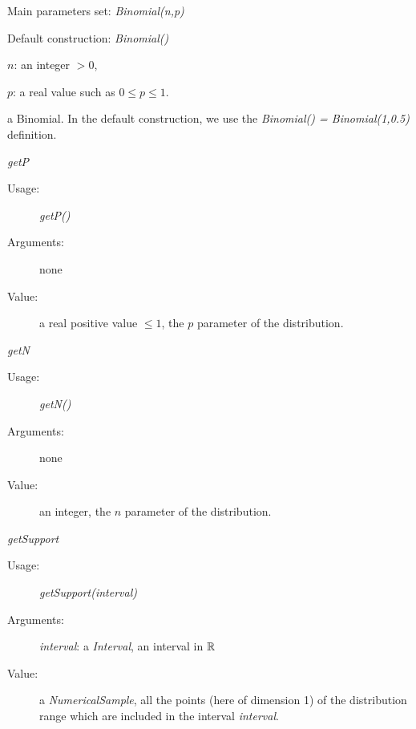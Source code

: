 \begin{description}

\item[Usage:]\rule{0pt}{1em}
\begin{description}
\item Main parameters set: \textit{Binomial(n,p)}
\item  Default construction: \textit{Binomial()}
\end{description}

\item[Arguments:]  \rule{0pt}{1em}
\begin{description}
\item $n$: an integer $>0$,
\item  $p$: a real value such as $0\leq p\leq 1$.
\end{description}

\item[Value:] a Binomial. In the default construction, we use the \textit{Binomial() = Binomial(1,0.5)} definition.

\item[Some methods:] \rule{0pt}{1em}
\begin{description}

\item \textit{getP}
\begin{description}
\item[Usage:] \textit{getP()}
\item[Arguments:] none
\item[Value:]  a real positive value $\leq 1$, the $p$ parameter of the  distribution.
\end{description}
\bigskip

\item \textit{getN}
\begin{description}
\item[Usage:] \textit{getN()}
\item[Arguments:] none
\item[Value:]  an integer, the $n$ parameter of the  distribution.
\end{description}
\bigskip

\item \textit{getSupport}
\begin{description}
\item[Usage:] \textit{getSupport(interval)}
\item[Arguments:] \textit{interval}: a \textit{Interval}, an interval in ${\mathbb R}$
\item[Value:]  a \textit{NumericalSample}, all the points (here of dimension 1) of the distribution range which are included in the interval \textit{interval}.
\end{description}


\end{description}
\end{description}
